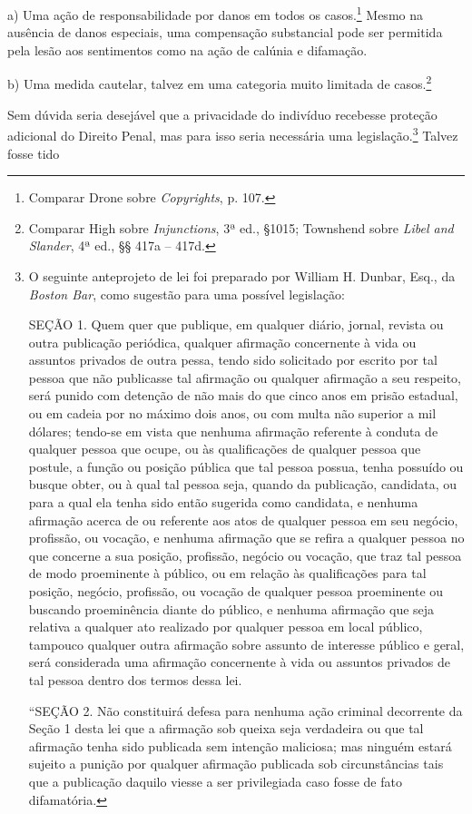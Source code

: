 a) Uma ação de responsabilidade por danos em todos os casos.\footnote{Comparar
  Drone sobre \emph{Copyrights}, p. 107.} Mesmo na ausência de danos
especiais, uma compensação substancial pode ser permitida pela lesão aos
sentimentos como na ação de calúnia e difamação.

b) Uma medida cautelar, talvez em uma categoria muito limitada de
casos.\footnote{Comparar High sobre \emph{Injunctions}, 3ª ed., §1015;
  Townshend sobre \emph{Libel and Slander}, 4ª ed., §§ 417a -- 417d.}

Sem dúvida seria desejável que a privacidade do indivíduo recebesse
proteção adicional do Direito Penal, mas para isso seria necessária uma
legislação.\footnote{O seguinte anteprojeto de lei foi preparado por
  William H. Dunbar, Esq., da \emph{Boston Bar}, como sugestão para uma
  possível legislação:

  SEÇÃO 1. Quem quer que publique, em qualquer diário, jornal, revista
  ou outra publicação periódica, qualquer afirmação concernente à vida
  ou assuntos privados de outra pessa, tendo sido solicitado por escrito
  por tal pessoa que não publicasse tal afirmação ou qualquer afirmação
  a seu respeito, será punido com detenção de não mais do que cinco anos
  em prisão estadual, ou em cadeia por no máximo dois anos, ou com multa
  não superior a mil dólares; tendo-se em vista que nenhuma afirmação
  referente à conduta de qualquer pessoa que ocupe, ou às qualificações
  de qualquer pessoa que postule, a função ou posição pública que tal
  pessoa possua, tenha possuído ou busque obter, ou à qual tal pessoa
  seja, quando da publicação, candidata, ou para a qual ela tenha sido
  então sugerida como candidata, e nenhuma afirmação acerca de ou
  referente aos atos de qualquer pessoa em seu negócio, profissão, ou
  vocação, e nenhuma afirmação que se refira a qualquer pessoa no que
  concerne a sua posição, profissão, negócio ou vocação, que traz tal
  pessoa de modo proeminente à público, ou em relação às qualificações
  para tal posição, negócio, profissão, ou vocação de qualquer pessoa
  proeminente ou buscando proeminência diante do público, e nenhuma
  afirmação que seja relativa a qualquer ato realizado por qualquer
  pessoa em local público, tampouco qualquer outra afirmação sobre
  assunto de interesse público e geral, será considerada uma afirmação
  concernente à vida ou assuntos privados de tal pessoa dentro dos
  termos dessa lei.

  ``SEÇÃO 2. Não constituirá defesa para nenhuma ação criminal
  decorrente da Seção 1 desta lei que a afirmação sob queixa seja
  verdadeira ou que tal afirmação tenha sido publicada sem intenção
  maliciosa; mas ninguém estará sujeito a punição por qualquer afirmação
  publicada sob circunstâncias tais que a publicação daquilo viesse a
  ser privilegiada caso fosse de fato difamatória.} Talvez fosse tido
